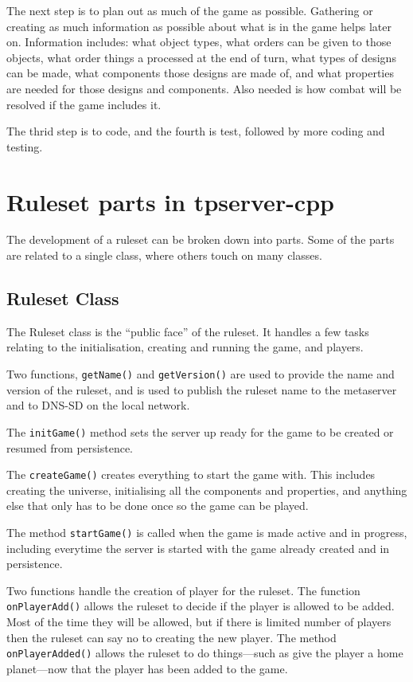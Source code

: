 \documentclass[a4paper,11pt]{report}
\begin{document}
The next step is to plan out as much of the game as possible. Gathering or creating as much information as possible about what is in the game helps later on. Information includes: what object types, what orders can be given to those objects, what order things a processed at the end of turn, what types of designs can be made, what components those designs are made of, and what properties are needed for those designs and components.  Also needed is how combat will be resolved if the game includes it.


The thrid step is to code, and the fourth is test, followed by more coding and testing.


\chapter{Ruleset parts in tpserver-cpp}
\label{chap:ruleset-parts}

The development of a ruleset can be broken down into parts. Some of the parts are related to a single class, where others touch on many classes.

\section{Ruleset Class}
\label{sec:ruleset-class}

The Ruleset class is the ``public face'' of the ruleset. It handles a few tasks relating to the initialisation, creating and running the game, and players.

Two functions, \texttt{getName()} and \texttt{getVersion()} are used to provide the name and version of the ruleset, and is used to publish the ruleset name to the metaserver and to DNS-SD on the local network.

The \texttt{initGame()} method sets the server up ready for the game to be created or resumed from persistence.

The \texttt{createGame()} creates everything to start the game with. This includes creating the universe, initialising all the components and properties, and anything else that only has to be done once so the game can be played.

The method \texttt{startGame()} is called when the game is made active and in progress, including everytime the server is started with the game already created and in persistence.

Two functions handle the creation of player for the ruleset.  The function \texttt{onPlayerAdd()} allows the ruleset to decide if the player is allowed to be added. Most of the time they will be allowed, but if there is limited number of players then the ruleset can say no to creating the new player. The method \texttt{onPlayerAdded()} allows the ruleset to do things---such as give the player a home planet---now that the player has been added to the game.
\end{document}
